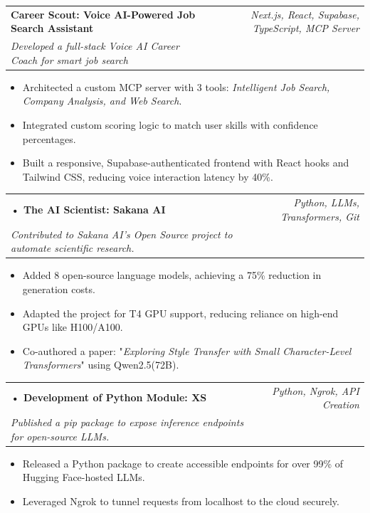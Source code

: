 \documentclass[a4paper,11pt]{article}
\makeatletter
\newcommand{\resumeProject}[4]{
\vspace{0.5mm}\item
    \begin{tabular*}{0.98\textwidth}[t]{l@{\extracolsep{\fill}}r}
        \textbf{#1} & \textit{\footnotesize{#3}} \\
        \footnotesize{\textit{#2}} & \footnotesize{#4}
    \end{tabular*}
    \vspace{-2.4mm}
}
\newcommand{\resumeItemListStart}{\begin{justify}\begin{itemize}[leftmargin=3ex, rightmargin=2ex, noitemsep,labelsep=1.2mm,itemsep=0mm]\small}
\newcommand{\resumeItemListEnd}{\end{itemize}\end{justify}\vspace{-2mm}}
\makeatother
\begin{document}
\resumeProject
{Career Scout: Voice AI-Powered Job Search Assistant}
{Developed a full-stack Voice AI Career Coach for smart job search}
{Next.js, React, Supabase, TypeScript, MCP Server}
{\href{https://github.com/xprabhudayal/career-scout}{\textcolor{darkblue}{\faGithub}}}
\resumeItemListStart
  \item Architected a custom MCP server with 3 tools: \textit{Intelligent Job Search, Company Analysis, and Web Search}.
  \item Integrated custom scoring logic to match user skills with confidence percentages.  
  \item Built a responsive, Supabase-authenticated frontend with React hooks and Tailwind CSS, reducing voice interaction latency by 40\%.
\resumeItemListEnd

\resumeProject
{• The AI Scientist: Sakana AI} 
{Contributed to Sakana AI's Open Source project to automate scientific research.}
{Python, LLMs, Transformers, Git}
{\href{https://huggingface.co/pradachan/AI-Scientist}{\textcolor{darkblue}{\faGithub}}}
\resumeItemListStart
 \item Added 8 open-source language models, achieving a 75\% reduction in generation costs.
 \item Adapted the project for T4 GPU support, reducing reliance on high-end GPUs like H100/A100.
 \item Co-authored a paper: "\textit{Exploring Style Transfer with Small Character-Level Transformers}" using Qwen2.5(72B).
\resumeItemListEnd

\resumeProject
{• Development of Python Module: XS}
{Published a pip package to expose inference endpoints for open-source LLMs.}
{Python, Ngrok, API Creation}
{\href{https://github.com/xprabhudayal/xs/}{\textcolor{darkblue}{\faGithub}}}
\resumeItemListStart
 \item Released a Python package to create accessible endpoints for over 99\% of Hugging Face-hosted LLMs.
 \item Leveraged Ngrok to tunnel requests from localhost to the cloud securely.
\resumeItemListEnd

\vspace{2.5mm}


\end{document}
